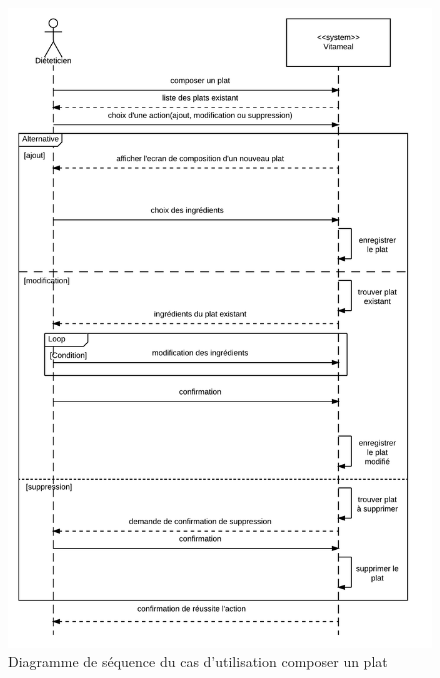 \begin{figure}
\centering
\includegraphics[scale=0.3]{../../CasDUtilisations/CompositionPlat/sequence_UC_ComposerPlat.png}
\caption{Diagramme de séquence du cas d'utilisation composer un plat}
\label{ComposerPlatSeq}
\end{figure}